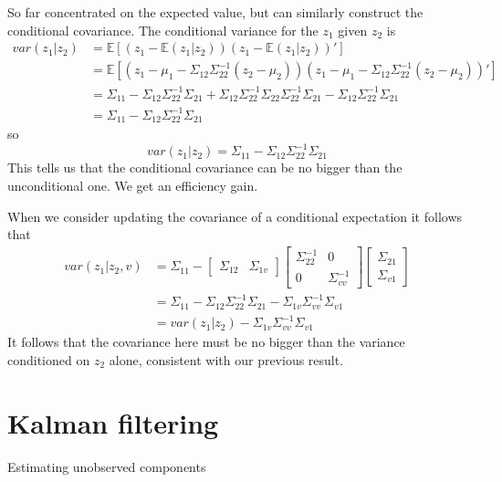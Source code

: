 \documentclass[
  letterpaper,
]{book}
\begin{document}
So far concentrated on the expected value, but can similarly construct
the conditional covariance. The conditional variance for the \(z_1\)
given \(z_2\) is \[
\begin{align}
var(z_1|z_2) &= \mathbb{E}\left[\left(z_1 - \mathbb{E}(z_1|z_2) \right) \left(z_1 - \mathbb{E}(z_1|z_2) \right)' \right] \\
&= \mathbb{E}\left[ \left(z_1 -\mu_1-\Sigma_{12}\Sigma_{22}^{-1}(z_2-\mu_2) \right) \left(z_1-\mu_1 -\Sigma_{12}\Sigma_{22}^{-1} (z_2-\mu_2) \right)' \right] \\
&= \Sigma_{11}-\Sigma_{12}\Sigma_{22}^{-1}\Sigma_{21} + \Sigma_{12}\Sigma_{22}^{-1}\Sigma_{22}\Sigma_{22}^{-1}\Sigma_{21} - \Sigma_{12}\Sigma_{22}^{-1}\Sigma_{21} \\
&= \Sigma_{11}-\Sigma_{12}\Sigma_{22}^{-1}\Sigma_{21}
\end{align}
\] so \[
  var(z_1|z_2) = \Sigma_{11}-\Sigma_{12}\Sigma_{22}^{-1}\Sigma_{21}
\] This tells us that the conditional covariance can be no bigger than
the unconditional one. We get an efficiency gain.

When we consider updating the covariance of a conditional expectation it
follows that \[
\begin{align}
var(z_1|z_2,v) &= \Sigma_{11}-
   \begin{bmatrix} \Sigma_{12} & \Sigma_{1v} \end{bmatrix} 
   \begin{bmatrix} \Sigma_{22}^{-1} & 0 \\  0 & \Sigma_{vv}^{-1} \end{bmatrix}
   \begin{bmatrix} \Sigma_{21} \\ \Sigma_{v1} \end{bmatrix} \\
  &= \Sigma_{11} - \Sigma_{12}\Sigma_{22}^{-1}\Sigma_{21} - \Sigma_{1v}\Sigma_{vv}^{-1}\Sigma_{v1} \\
  &= var(z_1|z_2) - \Sigma_{1v}\Sigma_{vv}^{-1}\Sigma_{v1}
\end{align}
\] It follows that the covariance here must be no bigger than the
variance conditioned on \(z_2\) alone, consistent with our previous
result.

\hypertarget{kalman-filtering}{%
\chapter{Kalman filtering}\label{kalman-filtering}}

Estimating unobserved components
\end{document}
